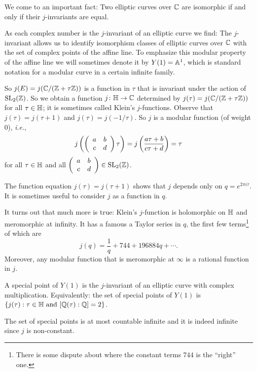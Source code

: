 We come to an important fact: Two elliptic curves over ${\mathbb{C}}$ are
isomorphic if and only if their $j$-invariants are equal.

As each complex number is the $j$-invariant of an elliptic curve we
find: The $j$-invariant allows us to identify isomorphism classes of
elliptic curves over ${\mathbb{C}}$ with the set of complex points of the
affine line. To emphasize this modular property of the affine line we
will sometimes denote it by $Y(1)={\mathbb{A}}^1$, which is standard notation
for a modular curve in a certain infinite family.

So $j(E) = j({\mathbb{C}}/({\mathbb{Z}}+\tau{\mathbb{Z}}))$ is a function in $\tau$ that is
invariant under the action of $\mathrm{SL}_2({\mathbb{Z}})$. So we obtain a
function $j\colon {\mathbb{H}}\rightarrow {\mathbb{C}}$ determined by $j(\tau) =
j({\mathbb{C}}/({\mathbb{Z}}+\tau{\mathbb{Z}}))$ for all $\tau\in{\mathbb{H}}$; it is sometimes called
Klein's $j$-functions. Observe that $j(\tau)=j(\tau+1)$ and $j(\tau) =
j(-1/\tau)$. So $j$ is a modular function (of weight $0$),
\textit{i.e.}, 
\begin{equation*}
  j\left(\left( \begin{array}{cc} {a} & {b} \\ {c} & {d} \end{array} \right) \tau\right) = j\left(\frac{a\tau + b}{c\tau +d}\right) =
    \tau 
\end{equation*}
for all $\tau\in{\mathbb{H}}$ and all $\left( \begin{array}{cc} {a} & {b} \\ {c} & {d} \end{array} \right)\in
\mathrm{SL}_2({\mathbb{Z}})$.

The function equation $j(\tau)=j(\tau+1)$ shows that $j$ depends only
on $q=e^{2\pi i \tau}$. It is sometimes useful to consider $j$ as a
function in $q$.

It turns out that much more is true: Klein's $j$-function is
holomorphic on ${\mathbb{H}}$ and meromorphic at infinity. It has a famous 
a Taylor series in $q$, the first few terms\footnote{There is some
  dispute about where the constant terms $744$ is the ``right'' one.} of which are 
\begin{equation*}
  j(q) = \frac 1q + 744 + 196884q +\cdots. 
\end{equation*}
Moreover, any modular function that is meromorphic at $\infty$ is a
rational function in $j$.

\begin{definition}
  \label{def:specialY1}
  A special point of $Y(1)$ is the $j$-invariant of an elliptic curve
  with complex multiplication. Equivalently: the set of special points
  of $Y(1)$ is $\{j(\tau) : \tau\in{\mathbb{H}} \text{ and }[{\mathbb{Q}}(\tau):{\mathbb{Q}}]=2\}$. 
\end{definition}

The set of special points is at most countable infinite and it is
indeed infinite since $j$ is non-constant.

